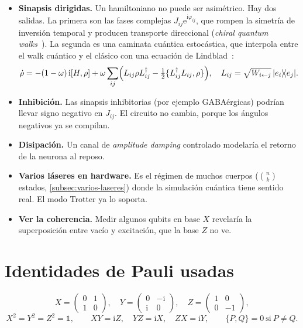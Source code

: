 \documentclass[11pt,a4paper]{article}
\renewcommand{\ket}[1]{\lvert #1\rangle}
\renewcommand{\bra}[1]{\langle #1\rvert}
\newcommand{\e}{\mathrm{e}}
\newcommand{\ii}{\mathrm{i}}
\theoremstyle{plain}
\theoremstyle{definition}
\theoremstyle{remark}
\begin{document}
\begin{itemize}
\item \textbf{Sinapsis dirigidas.} Un hamiltoniano no puede ser asimétrico. Hay dos salidas. La primera son las fases complejas $J_{ij}\e^{\ii\varphi_{ij}}$, que rompen la simetría de inversión temporal y producen transporte direccional (\emph{chiral quantum walks}~\cite{zimboras2013}). La segunda es una caminata cuántica estocástica, que interpola entre el walk cuántico y el clásico con una ecuación de Lindblad~\cite{whitfield2010}:
\begin{equation}
\dot\rho=-(1-\omega)\,\ii[H,\rho]+\omega\sum_{ij}\Bigl(L_{ij}\rho L_{ij}^\dagger-\tfrac12\{L_{ij}^\dagger L_{ij},\rho\}\Bigr),\quad L_{ij}=\sqrt{W_{i\leftarrow j}}\,\ket{e_i}\!\bra{e_j}.
\end{equation}
\item \textbf{Inhibición.} Las sinapsis inhibitorias (por ejemplo GABAérgicas) podrían llevar signo negativo en $J_{ij}$. El circuito no cambia, porque los ángulos negativos ya se compilan.
\item \textbf{Disipación.} Un canal de \emph{amplitude damping} controlado modelaría el retorno de la neurona al reposo.
\item \textbf{Varios láseres en hardware.} Es el régimen de muchos cuerpos ($\binom nk$ estados, \cref{subsec:varios-laseres}) donde la simulación cuántica tiene sentido real. El modo Trotter ya lo soporta.
\item \textbf{Ver la coherencia.} Medir algunos qubits en base $X$ revelaría la superposición entre vacío y excitación, que la base $Z$ no ve.
\end{itemize}

\appendix
\section{Identidades de Pauli usadas}
\label{app:pauli}

\begin{equation}
X=\begin{pmatrix}0&1\\1&0\end{pmatrix},\quad
Y=\begin{pmatrix}0&-\ii\\\ii&0\end{pmatrix},\quad
Z=\begin{pmatrix}1&0\\0&-1\end{pmatrix},
\end{equation}
\begin{equation}
X^2=Y^2=Z^2=\mathbb 1,\qquad XY=\ii Z,\quad YZ=\ii X,\quad ZX=\ii Y,\qquad
\{P,Q\}=0\ \text{si}\ P\ne Q.
\end{equation}
\end{document}
